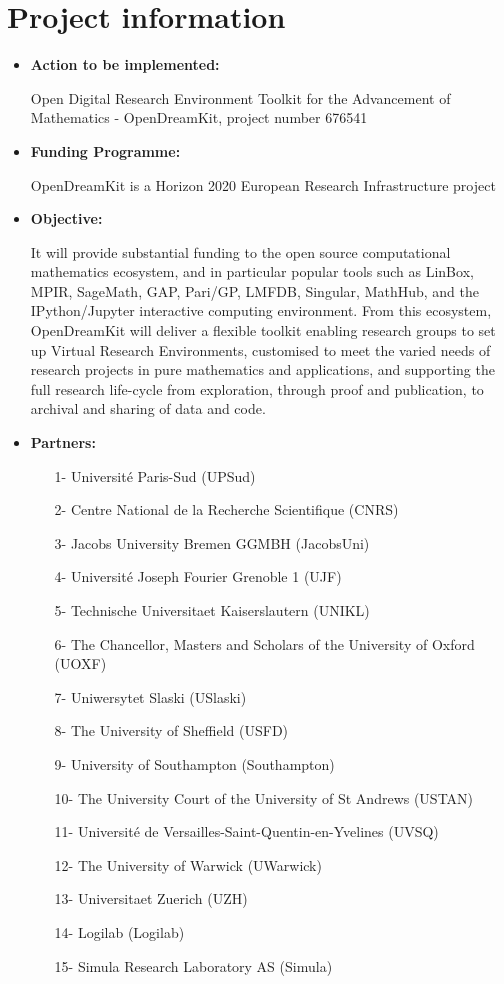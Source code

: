 \documentclass{../../Proposal/LaTeX-proposal/deliverablereport}
\begin{document}
\section{Project information}
\begin{itemize}
\item\textbf{Action to be implemented:}


Open Digital Research Environment Toolkit for the Advancement of Mathematics - OpenDreamKit, project number 676541
\item\textbf{Funding Programme:}


OpenDreamKit is a Horizon 2020 European Research Infrastructure project 
\item\textbf{Objective:}


It will provide substantial funding to the open source computational mathematics ecosystem, and in particular popular tools such as LinBox, MPIR, SageMath, GAP, Pari/GP, LMFDB, Singular, MathHub, and the IPython/Jupyter interactive computing environment.
From this ecosystem, OpenDreamKit will deliver a flexible toolkit enabling research groups to set up Virtual Research Environments, customised to meet the varied needs of research projects in pure mathematics and applications, and supporting the full research life-cycle from exploration, through proof and publication, to archival and sharing of data and code.
\item\textbf{Partners:}


\begin{enumerate}
\item[1-] Université Paris-Sud (UPSud)
\item[2-] Centre National de la Recherche Scientifique (CNRS)
\item[3-] Jacobs University Bremen GGMBH (JacobsUni)
\item[4-] Université Joseph Fourier Grenoble 1 (UJF)
\item[5-] Technische Universitaet Kaiserslautern (UNIKL)
\item[6-] The Chancellor, Masters and Scholars of the University of Oxford (UOXF)
\item[7-] Uniwersytet Slaski (USlaski)
\item[8-] The University of Sheffield (USFD)
\item[9-] University of Southampton (Southampton)
\item[10-] The University Court of the University of St Andrews (USTAN)
\item[11-] Université de Versailles-Saint-Quentin-en-Yvelines (UVSQ)
\item[12-] The University of Warwick (UWarwick)
\item[13-] Universitaet Zuerich (UZH)
\item[14-] Logilab (Logilab)
\item[15-] Simula Research Laboratory AS (Simula)
\end{enumerate}
\end{itemize}
\end{document}
